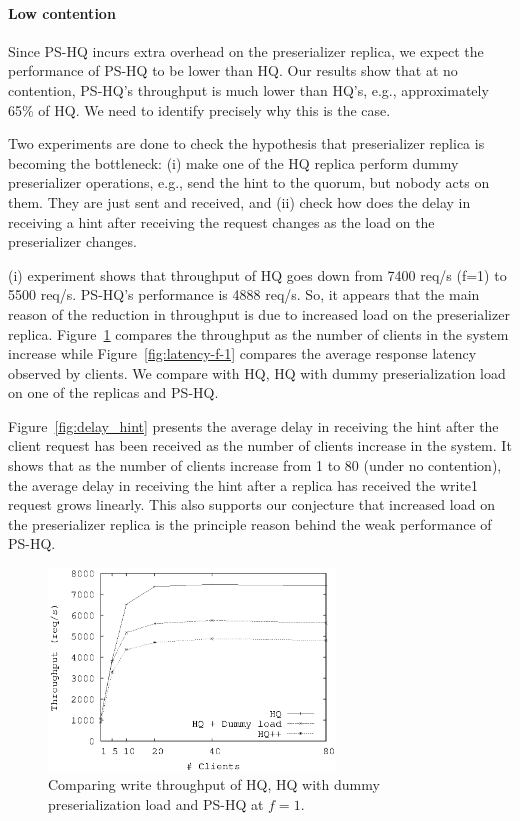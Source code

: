 \documentclass[twocolumn,10pt]{article}
\begin{document}
\paragraph{Low contention} Since PS-HQ incurs extra overhead on the preserializer replica, we
expect the performance of PS-HQ to be lower than HQ. Our results show that at no contention, PS-HQ's
throughput is much lower than HQ's, e.g., approximately 65\% of HQ. We need to identify precisely
why this is the case. 

Two experiments are done to check the hypothesis that preserializer replica is becoming the
bottleneck: (i) make one of the HQ replica perform dummy preserializer operations, e.g., send the
hint to the quorum, but nobody acts on them. They are just sent and received, and (ii) check how does
the delay in receiving a hint after receiving the request changes as the load on the preserializer 
changes.

(i) experiment shows that throughput of HQ goes down from 7400 req/s (f=1) to 5500 req/s. PS-HQ's
performance is 4888 req/s. So, it appears that the main reason of the reduction in throughput is
due to increased load on the preserializer replica. Figure~\ref{fig:throughput-compare-f-1} compares
the throughput as the number of clients in the system increase while Figure~\ref{fig:latency-f-1}
compares the average response latency observed by clients. We compare with HQ, HQ with dummy 
preserialization load on one of the replicas and PS-HQ.


Figure~\ref{fig:delay_hint} presents the average delay in receiving the hint after the client 
request has been received as the number of clients increase in the system. It shows that  as the 
number of clients increase from 1 to 80 (under no contention), the average delay in 
receiving the hint after a replica has received the write1 request grows linearly. This also supports
our conjecture that increased load on the preserializer replica is the principle reason behind the
weak performance of PS-HQ.

\begin{figure}
\centering
\includegraphics[width=3.0in]{temp-Figures/Throughput-compare.ps}
\caption{Comparing write throughput of HQ, HQ with dummy preserialization load and  PS-HQ 
at $f=1$.}
\label{fig:throughput-compare-f-1}
\end{figure}
\end{document}
